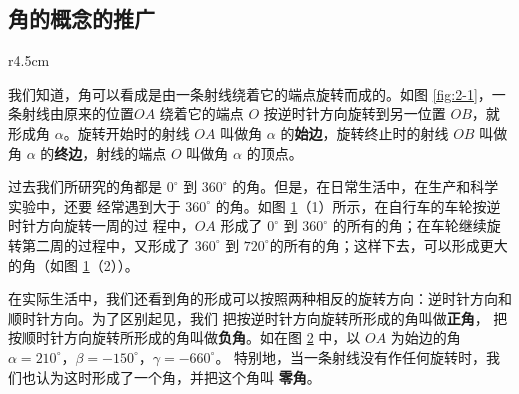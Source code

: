 \subsection{角的概念的推广}\label{subsec:2-1}

%     

\begin{wrapfigure}[8]{r}{4.5cm}
    \centering
    
    \vspace{-20pt}
    \caption{}\label{fig:2-1}
\end{wrapfigure}

我们知道，角可以看成是由一条射线绕着它的端点旋转而成的。如图 \ref{fig:2-1}，一条射线由原来的位置$OA$
绕着它的端点 $O$ 按逆时针方向旋转到另一位置 $OB$，就形成角 $\alpha$。旋转开始时的射线 $OA$ 叫做角
$\alpha$ 的\textbf{始边}，旋转终止时的射线 $OB$ 叫做角 $\alpha$ 的\textbf{终边}，射线的端点 $O$
叫做角 $\alpha$ 的顶点。

过去我们所研究的角都是 $0^\circ$ 到 $360^\circ$ 的角。但是，在日常生活中，在生产和科学实验中，还要
经常遇到大于 $360^\circ$ 的角。如图 \ref{fig:2-2}（1）所示，在自行车的车轮按逆时针方向旋转一周的过
程中，$OA$ 形成了 $0^\circ$ 到 $360^\circ$ 的所有的角；在车轮继续旋转第二周的过程中，又形成了
$360^\circ$ 到 $720^\circ$的所有的角；这样下去，可以形成更大的角（如图 \ref{fig:2-2}（2））。

\begin{figure}[htbp]
    \centering
    \begin{minipage}{8cm}
    \centering
    
    \caption*{（1）}
    \end{minipage}
    \qquad
    \begin{minipage}{8cm}
    \centering
    
    \caption*{（2）}
    \end{minipage}
    \caption{}\label{fig:2-2}
\end{figure}

在实际生活中，我们还看到角的形成可以按照两种相反的旋转方向：逆时针方向和顺时针方向。为了区别起见，我们
把按逆时针方向旋转所形成的角叫做\textbf{正角}，
把按顺时针方向旋转所形成的角叫做\textbf{负角}。如在图 \ref{fig:2-3} 中，以 $OA$ 为始边的角
$\alpha = 210^\circ$，$\beta = -150^\circ$，$\gamma = -660^\circ$。
特别地，当一条射线没有作任何旋转时，我们也认为这时形成了一个角，并把这个角叫 \textbf{零角}。

\begin{figure}[htbp]
    \centering
    
    \caption{}\label{fig:2-3}
\end{figure}

